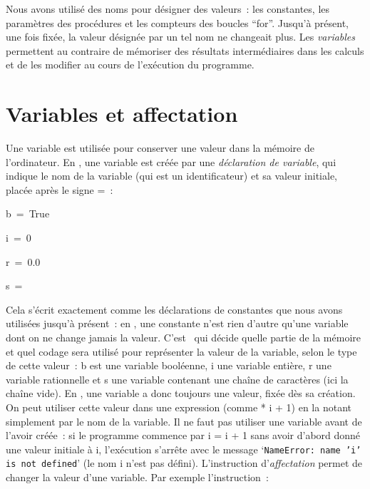 Nous avons utilisé des noms pour désigner des valeurs~: les constantes, les paramètres des
procédures et les compteurs des boucles ``for''. Jusqu'à présent, une fois fixée, la valeur désignée par un tel nom
ne changeait plus. Les {\em variables} permettent au contraire de mémoriser des résultats
intermédiaires dans les calculs et de les modifier au cours de l'exécution du programme.

\section{Variables et affectation}
Une variable est utilisée pour conserver une valeur dans la mémoire
de l'ordinateur. En \python, une variable est créée par une {\em déclaration de
variable}, qui indique le nom de la variable (qui est un identificateur)
et sa valeur initiale, placée après le signe {\idt =}~:

\vspace{\neglskip}\mbox{\blc  \blk\idt  b\ =\ \mcl True}\par
\vspace{\neglskip}\mbox{\blc  \blk\idt  i\ =\ 0}\par
\vspace{\neglskip}\mbox{\blc  \blk\idt  r\ =\ 0.0}\par
\vspace{\neglskip}\mbox{\blc  \blk\idt  s\ =\ {\cha {}}}\par

\noindent Cela s'écrit exactement comme les déclarations de constantes que nous avons utilisées
jusqu'à présent~: en \python, une constante n'est rien d'autre qu'une variable dont on ne change
jamais la valeur. C'est \python\ qui décide quelle partie de la mémoire et quel codage sera utilisé pour
représenter la valeur de la variable, selon le type de cette valeur~:
{\idt b} est une variable booléenne, {\idt i} une variable entière, {\idt r} une variable
rationnelle et {\idt s} une variable contenant une chaîne de caractères (ici la chaîne vide). En \python, une variable
a donc toujours une valeur, fixée dès sa création. On peut utiliser cette valeur dans une
expression (comme { * i + 1}) en la notant simplement par le nom de la variable.
Il ne faut pas utiliser une variable avant de l'avoir créée~: si le programme commence par
{\idt i = i + 1} sans avoir d'abord donné une valeur initiale à {\idt i}, l'exécution s'arrête
avec le message `{\tt NameError:\ name 'i' is not defined}' (le nom {\idt i} n'est pas défini).
L'instruction
d'{\em affectation\/} permet de changer la
valeur d'une variable. Par exemple l'instruction~:

